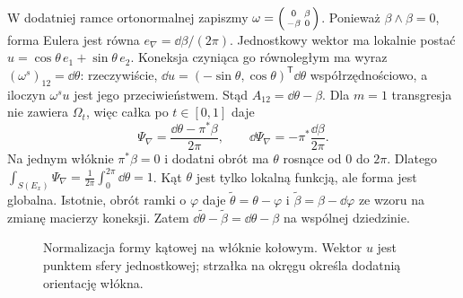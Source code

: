 \begin{przyklad}
\label{prz:angular-rank-two-17}
W dodatniej ramce ortonormalnej zapiszmy
$\omega=\begin{psmallmatrix}0&\beta\\-\beta&0\end{psmallmatrix}$.
Ponieważ $\beta\wedge\beta=0$, forma Eulera jest równa
$e_\nabla=\dd\beta/(2\pi)$.
Jednostkowy wektor ma lokalnie postać
$u=\cos\theta\,e_1+\sin\theta\,e_2$.
Koneksja czyniąca go równoległym ma wyraz
$(\omega^s)_{12}=\dd\theta$:
rzeczywiście, $\dd u=(-\sin\theta,\cos\theta)^{\mathsf T}\dd\theta$
współrzędnościowo, a iloczyn $\omega^s u$ jest jego przeciwieństwem.
Stąd $A_{12}=\dd\theta-\beta$.
Dla $m=1$ transgresja nie zawiera $\Omega_t$,
więc całka po $t\in[0,1]$ daje
\[
 \Psi_\nabla=\frac{\dd\theta-\pi^*\beta}{2\pi},
 \qquad
 \dd\Psi_\nabla=-\pi^*\frac{\dd\beta}{2\pi}.
\]
Na jednym włóknie $\pi^*\beta=0$ i dodatni obrót ma
$\theta$ rosnące od $0$ do $2\pi$.
Dlatego $\int_{S(E_x)}\Psi_\nabla
=\frac1{2\pi}\int_0^{2\pi}\dd\theta=1$.
Kąt $\theta$ jest tylko lokalną funkcją,
ale forma jest globalna.
Istotnie, obrót ramki o $\varphi$ daje
$\widetilde\theta=\theta-\varphi$ i
$\widetilde\beta=\beta-\dd\varphi$
ze wzoru na zmianę macierzy koneksji.
Zatem $\dd\widetilde\theta-\widetilde\beta
=\dd\theta-\beta$ na wspólnej dziedzinie.
\end{przyklad}

\begin{figure}[H]
\centering
{}
\caption{Normalizacja formy kątowej na włóknie kołowym.
Wektor $u$ jest punktem sfery jednostkowej;
strzałka na okręgu określa dodatnią orientację włókna.}
\label{fig:angular-kolo-normalizacja}
\end{figure}

